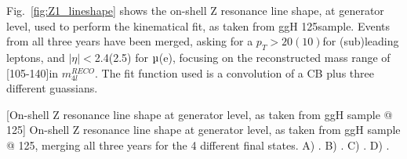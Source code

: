 Fig.~\ref{fig:Z1_lineshape} shows the on-shell Z resonance line shape, at generator level, 
used to perform the kinematical fit, as taken from ggH 125\GeV sample. 
Events from all three years have been merged, asking for a 
$p_T > 20(10)$\GeV for (sub)leading leptons, and $|\eta|<$2.4(2.5) for $\Pmu$(e), focusing on
the reconstructed mass range of [105-140]\GeV in $m_{4l}^{RECO}$. The fit function used is a convolution
of a CB plus three different guassians.
\begin{multiFigure}
    \centering
        [On-shell Z resonance line shape at generator level, as taken from ggH sample @ 125\GeV]
        {On-shell Z resonance line shape at generator level, as taken from ggH sample @ 125\GeV, %
        merging all three years for the 4 different final states.
        \;A) \fourmu.
        \;B) \foure.
        \;C) \twoetwomu.
        \;D) \twomutwoe.}
    \label{fig:Z1_lineshape}
\end{multiFigure}


